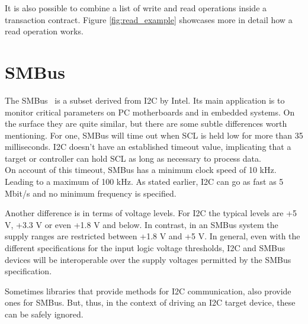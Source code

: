 It is also possible to combine a list of write and read operations inside a transaction contract.
Figure \ref{fig:read_example} showcases more in detail how a read operation works.

\section{SMBus}

The \gls{SMBus}~\cite{smbus} is a subset derived from \gls{I2C} by Intel. Its main application is to monitor critical parameters on PC motherboards and in embedded systems. On the surface they are quite similar, but there are some subtle differences worth mentioning. For one, \gls{SMBus} will time out when \gls{SCL} is held low for more than 35 milliseconds. \gls{I2C} doesn't have an established timeout value, implicating that a target or controller can hold \gls{SCL} as long as necessary to process data. \\
On account of this timeout, \gls{SMBus} has a minimum clock speed of 10 kHz. Leading to a maximum of 100 kHz. As stated earlier, \gls{I2C} can go as fast as 5 Mbit/s and no minimum frequency is specified.

Another difference is in terms of voltage levels. For \gls{I2C} the typical levels are +5 V, +3.3 V or even +1.8 V and below. In contrast, in an \gls{SMBus} system the supply ranges are restricted between +1.8 V and +5 V. In general, even with the different specifications for the input logic voltage thresholds, \gls{I2C} and \gls{SMBus} devices will be interoperable over the supply voltages permitted by the SMBus specification.

Sometimes libraries that provide methods for \gls{I2C} communication, also provide ones for \gls{SMBus}. But, thus, in the context of driving an \gls{I2C} target device, these can be safely ignored.

